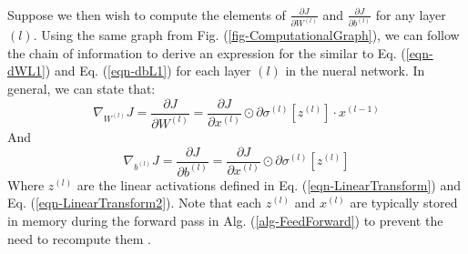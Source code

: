 \documentclass[12pt,letterpaper]{article}
\begin{document}
\paragraph*{}Suppose we then wish to compute the elements of $\frac{\partial J}{\partial W^{(l)}}$ and $\frac{\partial J}{\partial b^{(l)}}$ for any layer $(l)$. Using the same graph from Fig. (\ref{fig-ComputationalGraph}), we can follow the chain of information to derive an expression for the similar to Eq. (\ref{eqn-dWL1}) and Eq. (\ref{eqn-dbL1}) for each layer $(l)$ in the nueral network. In general, we can state that:
\begin{equation}
\label{eqn-dWGeneral}
\nabla_{W^{(l)}}J = \frac{\partial J}{\partial W^{(l)}} = 
\frac{\partial J}{\partial x^{(l)}}\odot \partial\sigma^{(l)}[ z^{(l)} ] \cdot x^{(l-1)}
\end{equation}
And
\begin{equation}
\label{eqn-dbGeneral}
\nabla_{b^{(l)}}J = \frac{\partial J}{\partial b^{(l)}} = 
\frac{\partial J}{\partial x^{(l)}}\odot \partial\sigma^{(l)}[ z^{(l)} ]
\end{equation}
Where $z^{(l)}$ are the linear activations defined in Eq. (\ref{eqn-LinearTransform}) and Eq. (\ref{eqn-LinearTransform2}). Note that each $z^{(l)}$ and $x^{(l)}$ are typically stored in memory during the forward pass in Alg. (\ref{alg-FeedForward}) to prevent the need to recompute them \cite{Geron2,Goodfellow}.
\end{document}
